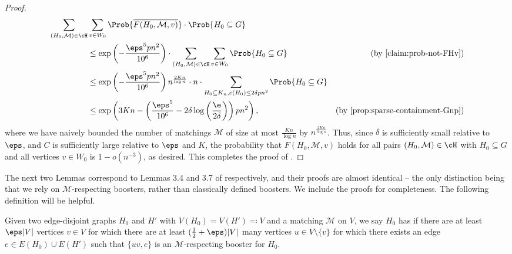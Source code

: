 \documentclass[10pt,a4paper,reqno]{amsart}
\begin{document}
\begin{proof}
\begin{align*}
    \sum_{\left(H_0, \mathcal{M}\right) \in \cH} & \sum_{v \in W_0} \Prob{\overline{F(H_0, \mathcal{M}, v)}} \cdot \Prob{H_0\subseteq G} \\
    &\leq \exp\left(-\frac{\eps^5 pn^2}{10^6}\right) \cdot\sum_{\left(H_0, \mathcal{M}\right) \in \cH} \sum_{v \in W_0} \Prob{H_0 \subseteq G} &\text{(by \Cref{claim:prob-not-FHv})}\\
    &\leq \exp\left(-\frac{\eps^5 pn^2}{10^6}\right) n^{\frac{2Kn}{\log{n}}} \cdot n \cdot \sum_{H_0 \subseteq K_n, e(H_0) \leq 2\delta pn^2}  \Prob{H_0 \subseteq G} \\
    &\leq \exp\left(3Kn - \left(\frac{\eps^5}{10^6} - 2\delta \log\left(\frac{\e}{2\delta}\right) \right) pn^2 \right), &\text{(by \Cref{prop:sparse-containment-Gnp})}
\end{align*}
where we have naively bounded the number of matchings $\mathcal{M}$ of size at most $\frac{Kn}{\log n}$ by $n^{\frac{2Kn}{\log{n}}}$. Thus, since $\delta$ is sufficiently small relative to $\eps$, and $C$ is sufficiently large relative to $\eps$ and $K$, the probability that $F(H_0, \mathcal{M}, v)$ holds for all pairs $(H_0, \mathcal{M}) \in \cH$ with $H_0 \subseteq G$ and all vertices $v \in W_0$ is $1 - o(n^{-3})$, as desired. This completes the proof of .
\end{proof}

The next two Lemmas correspond to Lemmas 3.4 and 3.7 of \cite{Montgomery2019resilient} respectively, and their proofs are almost identical -- the only distinction being that we rely on $\mathcal{M}$-respecting boosters, rather than classically defined boosters. We include the proofs for completeness. The following definition will be helpful.
\begin{definition}\label{def:M respecting booster}
  Given two edge-disjoint graphs $H_0$ and $H'$ with $V(H_0) = V(H') \eqqcolon V$ and a matching $\mathcal{M}$ on $V$, we say $H_0$ has  if there are at least $\eps|V|$ vertices $v \in V$ for which there are at least $(\frac{1}{2} + \eps)|V|$ many vertices $u \in V \setminus \{v\}$ for which there exists an edge $e \in E(H_0) \cup E(H')$ such that $\{uv, e\}$ is an $\mathcal{M}$-respecting booster for $H_0$.
\end{definition}
\end{document}
